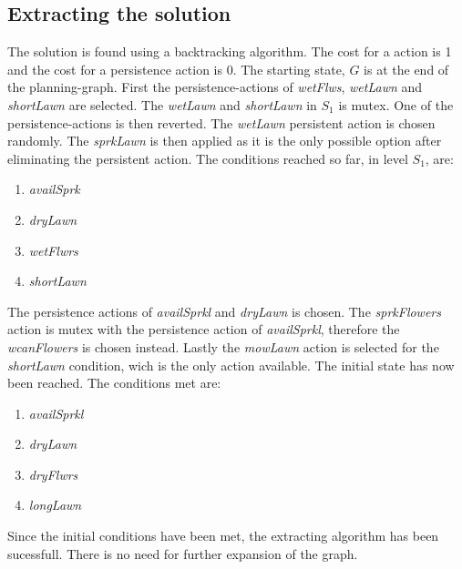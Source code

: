 \documentclass[english, a4paper]{article}
\begin{document}
\subsection{Extracting the solution}
The solution is found using a backtracking algorithm. The cost for a action is 1 and the cost for a persistence action is 0. The starting state, $G$ is at the end of the planning-graph. 
First the persistence-actions of \emph{wetFlws}, \emph{wetLawn} and \emph{shortLawn} are selected. The \emph{wetLawn} and \emph{shortLawn} in $S_1$ is mutex. One of the persistence-actions is then reverted. The \emph{wetLawn} persistent action is chosen randomly. The \emph{sprkLawn} is then applied as it is the only possible option after eliminating the persistent action.
The conditions reached so far, in level $S_1$, are:
\begin{enumerate}
	\item \emph{availSprk}
	\item \emph{dryLawn}
	\item \emph{wetFlwrs}
	\item \emph{shortLawn}
\end{enumerate}
The persistence actions of \emph{availSprkl} and \emph{dryLawn} is chosen. The \emph{sprkFlowers} action is mutex with the persistence action of \emph{availSprkl}, therefore the \emph{wcanFlowers} is chosen instead. Lastly the \emph{mowLawn} action is selected for the \emph{shortLawn} condition, wich is the only action available. The initial state has now been reached. The conditions met are:
 
\begin{enumerate}
	\item \emph{availSprkl}
	\item \emph{dryLawn}
	\item \emph{dryFlwrs}
	\item \emph{longLawn}
\end{enumerate}

Since the initial conditions have been met, the extracting algorithm has been sucessfull. There is no need for further expansion of the graph.
\end{document}
